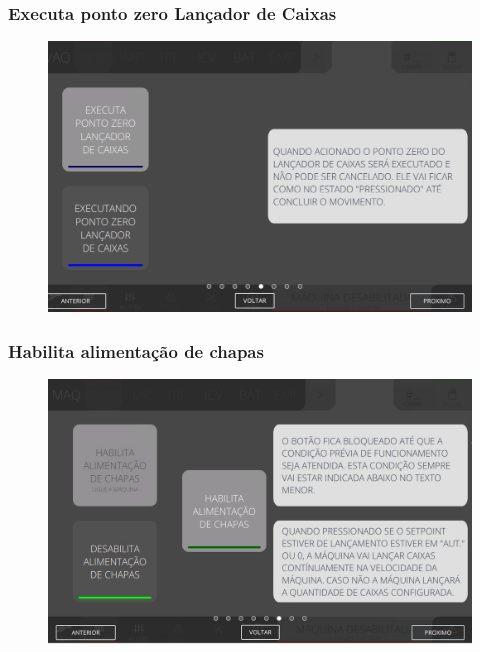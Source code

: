 \newpage
\thispagestyle{fancy}
\vspace*{40 pt}
\subsubsection{\small{Executa ponto zero Lançador de Caixas}} \label{sec:telaComandoAlimentacaoExecutaPontoZeroLancadorDeCaixas}
\vspace*{\fill}
\begin{figure}[h]
    \centering
    \includegraphics[width=576 px,height=360 px]{src/imagesICV/03-feeder/commands/6.png}
\end{figure}
\vspace*{\fill}

\newpage
\thispagestyle{fancy}
\vspace*{40 pt}
\subsubsection{\small{Habilita alimentação de chapas}} \label{sec:telaComandoAlimentacaoHabilitaAlimentacaoDeChapas}
\vspace*{\fill}
\begin{figure}[h]
    \centering
    \includegraphics[width=576 px,height=360 px]{src/imagesICV/03-feeder/commands/7.png}
\end{figure}
\vspace*{\fill}

